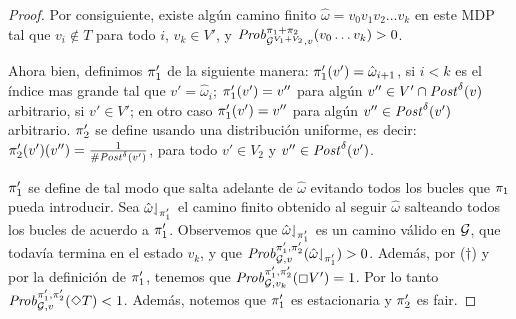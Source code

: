 \begin{proof}
  Por consiguiente, existe algún camino finito $\hat{\omega} = v_0 v_1 v_2 \dots v_k$
  en este MDP tal que $v_i \notin T$ para todo $i$, $v_k \in V'$, y
  $\mathit{Prob}^{\pi_{1}{+}\pi_{2}}_{\mathcal{G}^{V_1+V_2},v}(v_0\dots v_k) > 0$.

  Ahora bien, definimos $\pi_{1}'$ de la siguiente manera:
  $\pi_{1}'(v') = \hat{\omega}_{i+1}$, si $i < k$ es el índice mas grande tal que $v' = \hat{\omega}_{i}$;
  $\pi_{1}'(v') = v''$ para algún $v'' \in
  V'\cap\mathit{Post}^\delta(v)$ arbitrario, si $v' \in V'$;
  en otro caso $\pi_{1}'(v') = v''$ para algún
  $v'' \in \mathit{Post}^\delta(v')$ arbitrario.
  $\pi_{2}'$ se define usando una distribución uniforme, es decir:
  $\pi_{2}'(v')(v'') = \frac{1}{\# \mathit{Post}^\delta(v')}$, para todo $v'
  \in V_2$ y $v'' \in \mathit{Post}^\delta(v')$.
  
  $\pi_{1}'$ se define de tal modo que salta adelante de $\hat{\omega}$
  evitando todos los bucles que $\pi_{1}$ pueda introducir.  Sea
  $\hat{\omega}{\downharpoonleft}_{\pi_{1}'}$ el camino finito obtenido al seguir $\hat{\omega}$ salteando todos los bucles de acuerdo a $\pi_{1}'$.
  Observemos que $\hat{\omega}{\downharpoonleft}_{\pi_{1}'}$ es un camino válido en $\mathcal{G}$, que todavía termina en el estado $v_k$, y que
  $\mathit{Prob}^{\pi_{1}',\pi_{2}'}_{\mathcal{G},v}({\hat{\omega}{\downharpoonleft}_{\pi_{1}'}})>0$.
  Además, por ($\dag$) y por la definición de $\pi_{1}'$, tenemos que $\mathit{Prob}^{\pi_{1}',\pi_{2}'}_{\mathcal{G}, v_k}(\Box V') = 1$.
  Por lo tanto $\mathit{Prob}^{\pi_{1}',\pi_{2}'}_{\mathcal{G}, v}(\Diamond T) < 1$.
  Además, notemos que $\pi_{1}'$ es estacionaria y $\pi_{2}'$
  es fair.
\qedhere
\end{proof}
\fi


